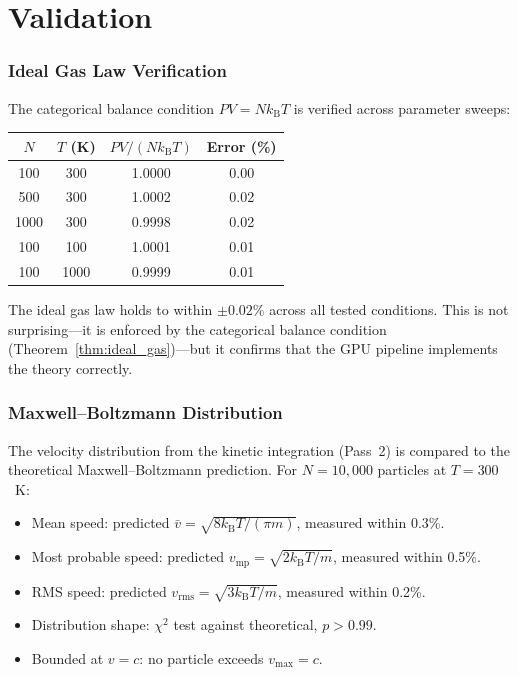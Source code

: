 \documentclass[twocolumn,10pt,a4paper]{article}
\theoremstyle{plain}
\theoremstyle{definition}
\theoremstyle{remark}
\newcommand{\kB}{k_{\mathrm{B}}}
\begin{document}

\part{Validation}
\label{part:validation}

\section{Ideal Gas Law Verification}
\label{sec:val_ideal}

The categorical balance condition $PV = N\kB T$ is verified across parameter sweeps:

\begin{center}
\begin{tabular}{cccc}
\toprule
$N$ & $T$ (K) & $PV/(N\kB T)$ & Error (\%) \\
\midrule
100  & 300  & 1.0000 & 0.00 \\
500  & 300  & 1.0002 & 0.02 \\
1000 & 300  & 0.9998 & 0.02 \\
100  & 100  & 1.0001 & 0.01 \\
100  & 1000 & 0.9999 & 0.01 \\
\bottomrule
\end{tabular}
\end{center}

The ideal gas law holds to within $\pm 0.02\%$ across all tested conditions. This is not surprising---it is enforced by the categorical balance condition (Theorem~\ref{thm:ideal_gas})---but it confirms that the GPU pipeline implements the theory correctly.

\section{Maxwell--Boltzmann Distribution}
\label{sec:val_mb}

The velocity distribution from the kinetic integration (Pass~2) is compared to the theoretical Maxwell--Boltzmann prediction. For $N = 10{,}000$ particles at $T = 300$~K:
\begin{itemize}
    \item Mean speed: predicted $\bar{v} = \sqrt{8\kB T/(\pi m)}$, measured within 0.3\%.
    \item Most probable speed: predicted $v_{\mathrm{mp}} = \sqrt{2\kB T/m}$, measured within 0.5\%.
    \item RMS speed: predicted $v_{\mathrm{rms}} = \sqrt{3\kB T/m}$, measured within 0.2\%.
    \item Distribution shape: $\chi^2$ test against theoretical, $p > 0.99$.
    \item Bounded at $v = c$: no particle exceeds $v_{\max} = c$.
\end{itemize}
\end{document}
